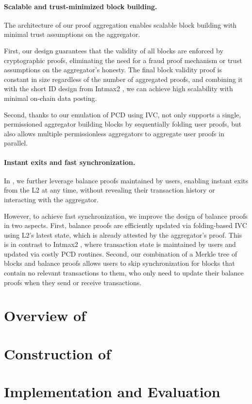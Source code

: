 \documentclass[a4paper,10pt]{article}
\begin{document}
\paragraph{Scalable and trust-minimized block building.}

The architecture of our proof aggregation enables scalable block building with minimal trust assumptions on the aggregator.

First, our design guarantees that the validity of all blocks are enforced by cryptographic proofs, eliminating the need for a fraud proof mechanism or trust assumptions on the aggregator's honesty.
The final block validity proof is constant in size regardless of the number of aggregated proofs, and combining it with the short ID design from Intmax2 \cite{cryptoeprint:2023/1082}, we can achieve high scalability with minimal on-chain data posting.

Second, thanks to our emulation of \ac{PCD} using \ac{IVC}, \Protocol not only supports a single, permissioned aggregator building blocks by sequentially folding user proofs, but also allows multiple permissionless aggregators to aggregate user proofs in parallel.

\paragraph{Instant exits and fast synchronization.}

In \Protocol, we further leverage balance proofs maintained by users, enabling instant exits from the \ac{L2} at any time, without revealing their transaction history or interacting with the aggregator.

However, to achieve fast synchronization, we improve the design of balance proofs in two aspects.
First, balance proofs are efficiently updated via folding-based \ac{IVC} using \ac{L2}'s latest state, which is already attested by the aggregator's proof.
This is in contrast to Intmax2 \cite{cryptoeprint:2023/1082}, where transaction state is maintained by users and updated via costly \ac{PCD} routines.
Second, our combination of a Merkle tree of blocks and balance proofs allows users to skip synchronization for blocks that contain no relevant transactions to them, who only need to update their balance proofs when they send or receive transactions.

\section{Overview of \Protocol}\label{sec:overview}



\section{Construction of \Protocol}



\section{Implementation and Evaluation}\label{sec:evaluation}







\end{document}
